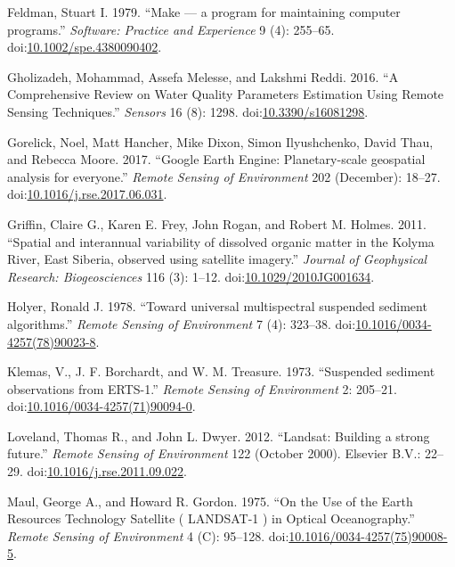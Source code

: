 \documentclass[]{article}
\begin{document}
\hypertarget{ref-Feldman1979}{}
Feldman, Stuart I. 1979. ``Make --- a program for maintaining computer
programs.'' \emph{Software: Practice and Experience} 9 (4): 255--65.
doi:\href{https://doi.org/10.1002/spe.4380090402}{10.1002/spe.4380090402}.

\hypertarget{ref-Gholizadeh2016}{}
Gholizadeh, Mohammad, Assefa Melesse, and Lakshmi Reddi. 2016. ``A
Comprehensive Review on Water Quality Parameters Estimation Using Remote
Sensing Techniques.'' \emph{Sensors} 16 (8): 1298.
doi:\href{https://doi.org/10.3390/s16081298}{10.3390/s16081298}.

\hypertarget{ref-Gorelick2017}{}
Gorelick, Noel, Matt Hancher, Mike Dixon, Simon Ilyushchenko, David
Thau, and Rebecca Moore. 2017. ``Google Earth Engine: Planetary-scale
geospatial analysis for everyone.'' \emph{Remote Sensing of Environment}
202 (December): 18--27.
doi:\href{https://doi.org/10.1016/j.rse.2017.06.031}{10.1016/j.rse.2017.06.031}.

\hypertarget{ref-Griffin2011}{}
Griffin, Claire G., Karen E. Frey, John Rogan, and Robert M. Holmes.
2011. ``Spatial and interannual variability of dissolved organic matter
in the Kolyma River, East Siberia, observed using satellite imagery.''
\emph{Journal of Geophysical Research: Biogeosciences} 116 (3): 1--12.
doi:\href{https://doi.org/10.1029/2010JG001634}{10.1029/2010JG001634}.

\hypertarget{ref-Holyer1978}{}
Holyer, Ronald J. 1978. ``Toward universal multispectral suspended
sediment algorithms.'' \emph{Remote Sensing of Environment} 7 (4):
323--38.
doi:\href{https://doi.org/10.1016/0034-4257(78)90023-8}{10.1016/0034-4257(78)90023-8}.

\hypertarget{ref-Klemas1973}{}
Klemas, V., J. F. Borchardt, and W. M. Treasure. 1973. ``Suspended
sediment observations from ERTS-1.'' \emph{Remote Sensing of
Environment} 2: 205--21.
doi:\href{https://doi.org/10.1016/0034-4257(71)90094-0}{10.1016/0034-4257(71)90094-0}.

\hypertarget{ref-Loveland2012}{}
Loveland, Thomas R., and John L. Dwyer. 2012. ``Landsat: Building a
strong future.'' \emph{Remote Sensing of Environment} 122 (October
2000). Elsevier B.V.: 22--29.
doi:\href{https://doi.org/10.1016/j.rse.2011.09.022}{10.1016/j.rse.2011.09.022}.

\hypertarget{ref-Maul1975}{}
Maul, George A., and Howard R. Gordon. 1975. ``On the Use of the Earth
Resources Technology Satellite ( LANDSAT-1 ) in Optical Oceanography.''
\emph{Remote Sensing of Environment} 4 (C): 95--128.
doi:\href{https://doi.org/10.1016/0034-4257(75)90008-5}{10.1016/0034-4257(75)90008-5}.
\end{document}
